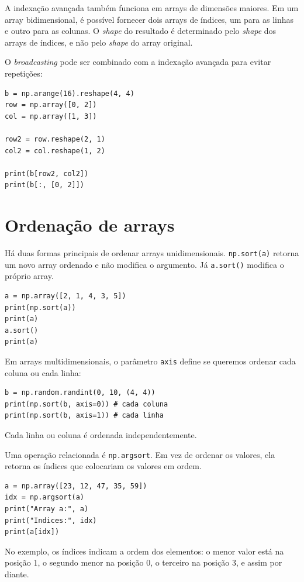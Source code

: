 \documentclass[11pt,a4paper]{article}
\begin{document}
A indexação avançada também funciona em arrays de dimensões maiores. Em um array bidimensional, é possível fornecer dois arrays de índices, um para as linhas e outro para as colunas. O \textit{shape} do resultado é determinado pelo \textit{shape} dos arrays de índices, e não pelo \textit{shape} do array original.

O \textit{broadcasting} pode ser combinado com a indexação avançada para evitar repetições:

\begin{lstlisting}
b = np.arange(16).reshape(4, 4)
row = np.array([0, 2])
col = np.array([1, 3])

row2 = row.reshape(2, 1)
col2 = col.reshape(1, 2)

print(b[row2, col2])
print(b[:, [0, 2]])
\end{lstlisting}

\section{Ordenação de arrays}

Há duas formas principais de ordenar arrays unidimensionais. \texttt{np.sort(a)} retorna um novo array ordenado e não modifica o argumento. Já \texttt{a.sort()} modifica o próprio array.

\begin{lstlisting}
a = np.array([2, 1, 4, 3, 5])
print(np.sort(a))
print(a)
a.sort()
print(a)
\end{lstlisting}

Em arrays multidimensionais, o parâmetro \texttt{axis} define se queremos ordenar cada coluna ou cada linha:

\begin{lstlisting}
b = np.random.randint(0, 10, (4, 4))
print(np.sort(b, axis=0)) # cada coluna
print(np.sort(b, axis=1)) # cada linha
\end{lstlisting}

Cada linha ou coluna é ordenada independentemente.

Uma operação relacionada é \texttt{np.argsort}. Em vez de ordenar os valores, ela retorna os índices que colocariam os valores em ordem.

\begin{lstlisting}
a = np.array([23, 12, 47, 35, 59])
idx = np.argsort(a)
print("Array a:", a)
print("Indices:", idx)
print(a[idx])
\end{lstlisting}

No exemplo, os índices indicam a ordem dos elementos: o menor valor está na posição 1, o segundo menor na posição 0, o terceiro na posição 3, e assim por diante.
\end{document}

